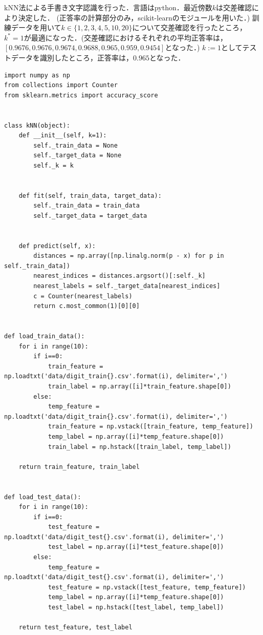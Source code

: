 \documentclass[11pt,a4paper,dvipdfmx]{article}
\theoremstyle{plain}
\newcommand{\1}{\mbox{1}\hspace{-0.25em}\mbox{l}}
\begin{document}
kNN法による手書き文字認識を行った．言語はpython．最近傍数$k$は交差確認により決定した．
(正答率の計算部分のみ，scikit-learnのモジュールを用いた．)
訓練データを用いて$k \in \{1,2,3,4,5,10,20\}$について交差確認を行ったところ，$k^* = 1$が最適になった．(交差確認におけるそれぞれの平均正答率は，$[0.9676,  0.9676,  0.9674,  0.9688,  0.965,   0.959,   0.9454]$となった．)
$k:=1$としてテストデータを識別したところ，正答率は，$0.965$となった．


\begin{lstlisting}
import numpy as np
from collections import Counter
from sklearn.metrics import accuracy_score


class kNN(object):
    def __init__(self, k=1):
        self._train_data = None
        self._target_data = None
        self._k = k


    def fit(self, train_data, target_data):
        self._train_data = train_data
        self._target_data = target_data


    def predict(self, x):
        distances = np.array([np.linalg.norm(p - x) for p in self._train_data])
        nearest_indices = distances.argsort()[:self._k]
        nearest_labels = self._target_data[nearest_indices]
        c = Counter(nearest_labels)
        return c.most_common(1)[0][0]


def load_train_data():
    for i in range(10):
        if i==0:
            train_feature = np.loadtxt('data/digit_train{}.csv'.format(i), delimiter=',')
            train_label = np.array([i]*train_feature.shape[0])
        else:
            temp_feature = np.loadtxt('data/digit_train{}.csv'.format(i), delimiter=',')
            train_feature = np.vstack([train_feature, temp_feature])
            temp_label = np.array([i]*temp_feature.shape[0])
            train_label = np.hstack([train_label, temp_label])
            
    return train_feature, train_label


def load_test_data():
    for i in range(10):
        if i==0:
            test_feature = np.loadtxt('data/digit_test{}.csv'.format(i), delimiter=',')
            test_label = np.array([i]*test_feature.shape[0])
        else:
            temp_feature = np.loadtxt('data/digit_test{}.csv'.format(i), delimiter=',')
            test_feature = np.vstack([test_feature, temp_feature])
            temp_label = np.array([i]*temp_feature.shape[0])
            test_label = np.hstack([test_label, temp_label])
            
    return test_feature, test_label



\end{lstlisting}
\end{document}
